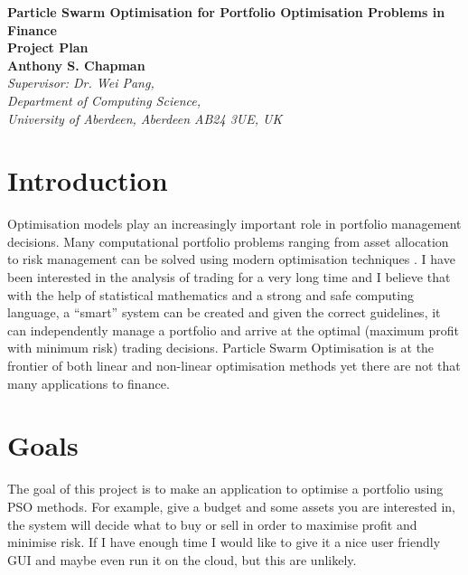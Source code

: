 \documentclass[a4paper,12pt]{article}
\begin{document}
\begin{center}
{\Large\bf{Particle Swarm Optimisation for Portfolio Optimisation Problems in Finance}} \\
      \vspace{5.0mm}
{\Large\bf{Project Plan}} \\
      \vspace{8mm}
      {\large\bf{Anthony S. Chapman}}  \\
      \vspace{5.0mm}
      {\em Supervisor: Dr. Wei Pang, \\
        Department of Computing Science,\\
        University of Aberdeen, Aberdeen AB24 3UE, UK} 
\end{center}


\section*{Introduction}
Optimisation models play an increasingly important role in portfolio management decisions. Many computational portfolio problems ranging from asset allocation to risk management can be solved using modern optimisation techniques \cite{complex}. I have been interested in the analysis of trading for a very long time and I believe that with the help of statistical mathematics and a strong and safe computing language, a ``smart'' system can be created and given the correct guidelines, it can independently manage a portfolio \cite{port,finance} and arrive at the optimal (maximum profit with minimum risk) trading decisions. Particle Swarm Optimisation is at the frontier of both linear and non-linear optimisation methods yet there are not that many applications to finance\cite{pso}.

  

\section*{Goals}
The goal of this project is to make an application to optimise a portfolio using PSO methods. For example, give a budget and some assets you are interested in, the system will decide what to buy or sell in order to maximise profit and minimise risk. If I have enough time I would like to give it a nice user friendly GUI and maybe even run it on the cloud, but this are unlikely. 
\end{document}
